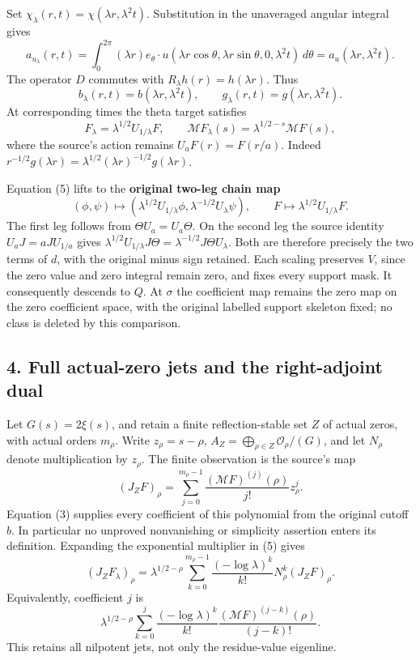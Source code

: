 Set \(\chi_\lambda(r,t)=\chi(\lambda r,\lambda^2t)\). Substitution in
the unaveraged angular integral gives \[
a_{u_\lambda}(r,t)=\int_0^{2\pi}(\lambda r)e_\theta\cdot u(\lambda r\cos\theta,\lambda r\sin\theta,0,\lambda^2t)\,d\theta
=a_u(\lambda r,\lambda^2t).
\] The operator \(D\) commutes with \(R_\lambda h(r)=h(\lambda r)\).
Thus \[
b_\lambda(r,t)=b(\lambda r,\lambda^2t),\qquad
g_\lambda(r,t)=g(\lambda r,\lambda^2t).
\tag{4}
\] At corresponding times the theta target satisfies \[
\boxed{F_\lambda=\lambda^{1/2}U_{1/\lambda}F,\qquad
\mathcal MF_\lambda(s)=\lambda^{1/2-s}\mathcal MF(s),}
\tag{5}
\] where the source's action remains \(U_aF(r)=F(r/a)\). Indeed
\(r^{-1/2}g(\lambda r)=\lambda^{1/2}(\lambda r)^{-1/2}g(\lambda r)\).

Equation (5) lifts to the \textbf{original two-leg chain map} \[
(\phi,\psi)\longmapsto
(\lambda^{1/2}U_{1/\lambda}\phi,\lambda^{-1/2}U_\lambda\psi),\qquad
F\longmapsto\lambda^{1/2}U_{1/\lambda}F.
\tag{6}
\] The first leg follows from \(\Theta U_a=U_a\Theta\). On the second
leg the source identity \(U_aJ=aJU_{1/a}\) gives
\(\lambda^{1/2}U_{1/\lambda}J\Theta=\lambda^{-1/2}J\Theta U_\lambda\).
Both are therefore precisely the two terms of \(d\), with the original
minus sign retained. Each scaling preserves \(V\), since the zero value
and zero integral remain zero, and fixes every support mask. It
consequently descends to \(Q\). At \(\sigma\) the coefficient map
remains the zero map on the zero coefficient space, with the original
labelled support skeleton fixed; no class is deleted by this comparison.

\subsection{4. Full actual-zero jets and the right-adjoint
dual}\label{full-actual-zero-jets-and-the-right-adjoint-dual}

Let \(G(s)=2\xi(s)\), and retain a finite reflection-stable set \(Z\) of
actual zeros, with actual orders \(m_\rho\). Write \(z_\rho=s-\rho\),
\(A_Z=\bigoplus_{\rho\in Z}\mathcal O_\rho/(G)\), and let \(N_\rho\)
denote multiplication by \(z_\rho\). The finite observation is the
source's map \[
(J_ZF)_\rho=\sum_{j=0}^{m_\rho-1}\frac{(\mathcal MF)^{(j)}(\rho)}{j!}z_\rho^j.
\] Equation (3) supplies every coefficient of this polynomial from the
original cutoff \(b\). In particular no unproved nonvanishing or
simplicity assertion enters its definition. Expanding the exponential
multiplier in (5) gives \[
\boxed{(J_ZF_\lambda)_\rho=\lambda^{1/2-\rho}
\sum_{k=0}^{m_\rho-1}\frac{(-\log\lambda)^k}{k!}N_\rho^k(J_ZF)_\rho.}
\tag{7}
\] Equivalently, coefficient \(j\) is \[
\lambda^{1/2-\rho}\sum_{k=0}^j
\frac{(-\log\lambda)^k}{k!}
\frac{(\mathcal MF)^{(j-k)}(\rho)}{(j-k)!}.
\] This retains all nilpotent jets, not only the residue-value
eigenline.

